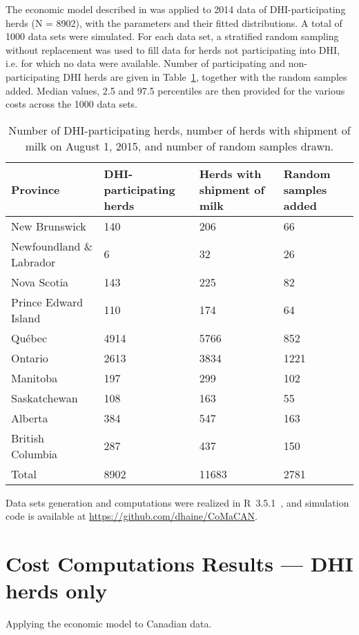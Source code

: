 \documentclass{article}\usepackage[]{graphicx}\usepackage[]{color}
\newcommand{\R}{{\normalfont\textsf{R}}{}}
\begin{document}
The economic model described in \cite{aghamohammadi_2018} was applied to 2014
data of DHI-participating herds (N = 8902), with the parameters and their fitted
distributions.
A total of 1000 data sets were simulated.
For each data set, a stratified random sampling without replacement was used to
fill data for herds not participating into DHI, i.e. for which no data were
available.
Number of participating and non-participating DHI herds are given in
Table~\ref{tab:dhi}, together with the random samples added.
Median values, 2.5 and 97.5 percentiles are then provided for the various
costs across the 1000 data sets.

\begin{table}[ht]
{\footnotesize
\caption{Number of DHI-participating herds, number of herds with shipment of
  milk on August 1, 2015, and number of random samples drawn.\label{tab:dhi}} 
\begin{center}
\begin{tabular}{llll}
\toprule
Province & DHI-participating herds & Herds with shipment of milk & Random samples added\tabularnewline
\midrule
New Brunswick & 140 & 206 & 66\tabularnewline
Newfoundland \& Labrador & 6 & 32 & 26\tabularnewline
Nova Scotia & 143 & 225 & 82\tabularnewline
Prince Edward Island & 110 & 174 & 64\tabularnewline
Québec & 4914 & 5766 & 852\tabularnewline
Ontario & 2613 & 3834 & 1221\tabularnewline
Manitoba & 197 & 299 & 102\tabularnewline
Saskatchewan & 108 & 163 & 55\tabularnewline
Alberta & 384 & 547 & 163\tabularnewline
British Columbia & 287 & 437 & 150\tabularnewline\midrule
Total & 8902 & 11683 & 2781\tabularnewline
\bottomrule
\end{tabular}\end{center}}
\end{table}

Data sets generation and computations were realized in \R\ 3.5.1~\cite{Rsystem}, and
simulation code is available at \url{https://github.com/dhaine/CoMaCAN}.



\section{Cost Computations Results --- DHI herds only}

Applying the economic model to Canadian data.
\end{document}
